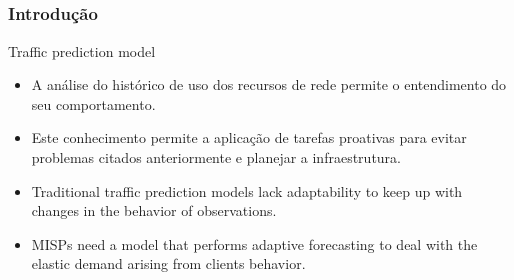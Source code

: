 \documentclass[aspectratio=169]{beamer}
\begin{document}

\subsection{}
\begin{frame}
\frametitle{Introdução}
\begin{block}{Traffic prediction model}
    \begin{itemize}
    \item A análise do histórico de uso dos recursos de rede permite o entendimento do seu comportamento.
        \item Este conhecimento permite a aplicação de tarefas proativas para evitar problemas citados anteriormente e planejar a infraestrutura.
        \item Traditional traffic prediction models lack adaptability to keep up with changes in the behavior of observations.
        \item MISPs need a model that performs adaptive forecasting to deal with the elastic demand arising from clients behavior.
    \end{itemize}
\end{block}
\end{frame}

\end{document}
